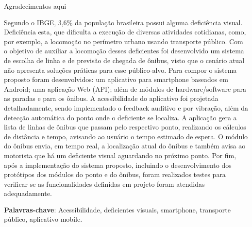 \documentclass[
	12pt,				%
	oneside,			%
	a4paper,			%
	brazil				%
]{abntex2}
\begin{document}
\begin{agradecimentos} 
Agradecimentos aqui
\end{agradecimentos} 


\setlength{\absparsep}{18pt} %
\begin{resumo}
 
Segundo o IBGE, 3,6\% da população brasileira possui alguma deficiência visual. Deficiência esta, que dificulta a execução de diversas atividades cotidianas, como, por exemplo, a locomoção no perímetro urbano usando transporte público. Com o objetivo de auxiliar a locomoção desses deficientes foi desenvolvido um sistema de escolha de linha e de previsão de chegada de ônibus, visto que o cenário atual não apresenta soluções práticas para esse público-alvo. Para compor o sistema proposto foram desenvolvidos: um aplicativo para smartphone baseados em Android; uma aplicação Web (API); além de módulos de hardware/software para as paradas e para os ônibus. A acessibilidade do aplicativo foi projetada detalhadamente, sendo implementado o feedback auditivo e por vibração, além da detecção automática do ponto onde o deficiente se localiza.  A aplicação gera a lista de linhas de ônibus que passam pelo respectivo ponto, realizando os cálculos de distância e tempo, avisando ao usuário o tempo estimado de espera. O módulo do ônibus envia, em tempo real, a localização atual do ônibus e também avisa ao motorista que há um deficiente visual aguardando no próximo ponto.  Por fim, após a implementação do sistema proposto, incluindo o desenvolvimento dos protótipos dos módulos do ponto e do ônibus, foram realizados testes para verificar se as funcionalidades definidas em projeto foram atendidas adequadamente. 

 \textbf{Palavras-chave}: Acessibilidade, deficientes visuais, smartphone, transporte público, aplicativo mobile.
\end{resumo}
\end{document}
